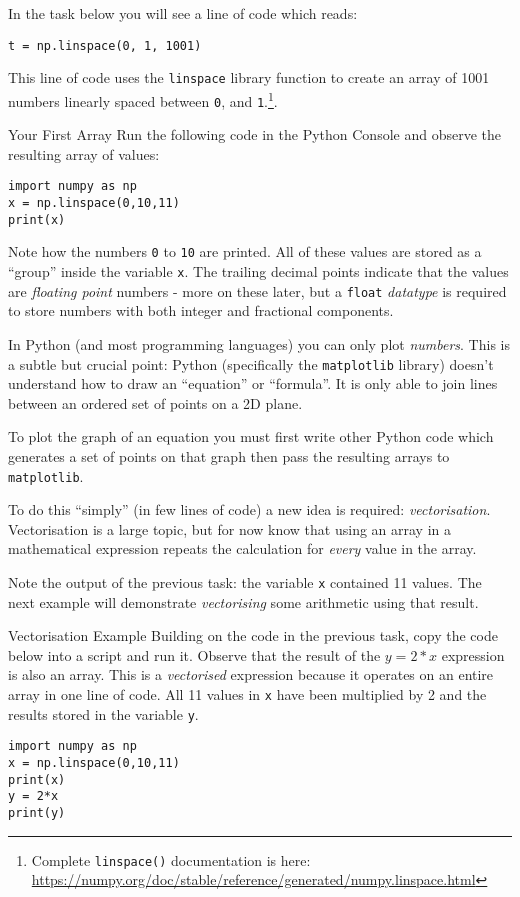 \documentclass{lab}
\begin{document}
In the task below you will see a line of code which reads:

\begin{lstlisting}
t = np.linspace(0, 1, 1001)
\end{lstlisting}

This line of code uses the \texttt{linspace} library function to create an array of 1001 numbers linearly spaced between \texttt{0}, and \texttt{1}.\footnote{Complete \texttt{linspace()} documentation is here: \url{https://numpy.org/doc/stable/reference/generated/numpy.linspace.html}}.

\begin{task}{Your First Array}{}
Run the following code in the Python Console and observe the resulting array of values:

\begin{lstlisting}
import numpy as np
x = np.linspace(0,10,11)
print(x)
\end{lstlisting}

Note how the numbers \texttt{0} to \texttt{10} are printed. All of these values are stored as a ``group'' inside the variable \texttt{x}. The trailing decimal points indicate that the values are \textit{floating point} numbers - more on these later, but a \texttt{float} \textit{datatype} is required to store numbers with both integer and fractional components.
\end{task}

In Python (and most programming languages) you can only plot \textit{numbers}. This is a subtle but crucial point: Python (specifically the \texttt{matplotlib} library) doesn't understand how to draw an ``equation'' or ``formula''. It is only able to join lines between an ordered set of points on a 2D plane.

To plot the graph of an equation you must first write other Python code which generates a set of points on that graph then pass the resulting arrays to \texttt{matplotlib}.

To do this ``simply'' (in few lines of code) a new idea is required: \textit{vectorisation}. Vectorisation is a large topic, but for now know that using an array in a mathematical expression repeats the calculation for \textit{every} value in the array.

Note the output of the previous task: the variable \texttt{x} contained 11 values. The next example will demonstrate \textit{vectorising} some arithmetic using that result.

\begin{task}{Vectorisation Example}{}
Building on the code in the previous task, copy the code below into a script and run it. Observe that the result of the $y = 2*x$ expression is also an array. This is a \textit{vectorised} expression because it operates on an entire array in one line of code. All 11 values in \texttt{x} have been multiplied by 2 and the results stored in the variable \texttt{y}.

\begin{lstlisting}
import numpy as np
x = np.linspace(0,10,11)
print(x)
y = 2*x
print(y)
\end{lstlisting}

\end{task}
\end{document}
